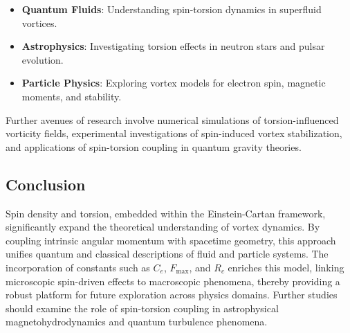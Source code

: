 \begin{itemize}

\item \textbf{Quantum Fluids}: Understanding spin-torsion dynamics in superfluid vortices.

\item \textbf{Astrophysics}: Investigating torsion effects in neutron stars and pulsar evolution.

\item \textbf{Particle Physics}: Exploring vortex models for electron spin, magnetic moments, and stability.

\end{itemize}

Further avenues of research involve numerical simulations of torsion-influenced vorticity fields, experimental investigations of spin-induced vortex stabilization, and applications of spin-torsion coupling in quantum gravity theories.


\subsection*{Conclusion}


Spin density and torsion, embedded within the Einstein-Cartan framework, significantly expand the theoretical understanding of vortex dynamics. By coupling intrinsic angular momentum with spacetime geometry, this approach unifies quantum and classical descriptions of fluid and particle systems. The incorporation of constants such as $C_e$, $F_{\max}$, and $R_c$ enriches this model, linking microscopic spin-driven effects to macroscopic phenomena, thereby providing a robust platform for future exploration across physics domains. Further studies should examine the role of spin-torsion coupling in astrophysical magnetohydrodynamics and quantum turbulence phenomena.

